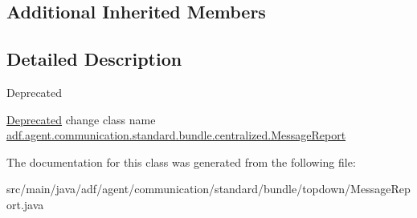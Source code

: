 \subsection*{Additional Inherited Members}


\subsection{Detailed Description}
\begin{DoxyRefDesc}{Deprecated}
\item[\hyperlink{deprecated__deprecated000005}{Deprecated}]change class name \hyperlink{classadf_1_1agent_1_1communication_1_1standard_1_1bundle_1_1centralized_1_1MessageReport}{adf.\+agent.\+communication.\+standard.\+bundle.\+centralized.\+Message\+Report} \end{DoxyRefDesc}


The documentation for this class was generated from the following file\+:\begin{DoxyCompactItemize}
\item 
src/main/java/adf/agent/communication/standard/bundle/topdown/Message\+Report.\+java\end{DoxyCompactItemize}
